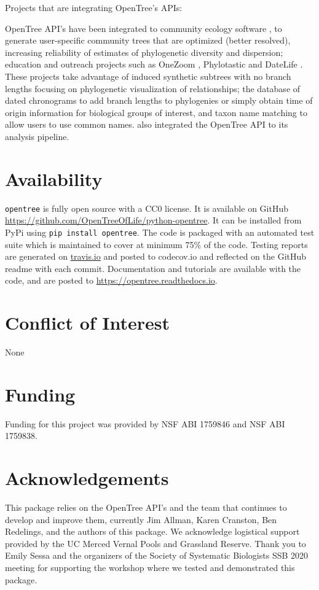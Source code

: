 \documentclass[oupdraft]{sysbio_sse}
\begin{document}
Projects that are integrating OpenTree's APIs:

OpenTree API’s have been integrated to community ecology software \citep{gastauer2018optimizing},
to generate user-specific community trees that are optimized (better resolved),
increasing reliability of estimates of phylogenetic diversity and dispersion;
education and outreach projects such as OneZoom \citep{rosindell2012onezoom, wong2020dynamic},
Phylotastic \citep{stoltzfus2013phylotastic, nguyen2020phylotastic} and DateLife
\citep{sanchez2019datelife}.
These projects take advantage of induced synthetic subtrees with no branch lengths
focusing on phylogenetic visualization of relationships; the database of dated
chronograms to add branch lengths to phylogenies or simply obtain time of origin
information for biological groups of interest, and taxon name matching to allow
users to use common names.
\citep{miller2020codonuse} also integrated the OpenTree API to its analysis pipeline.


\section{Availability}
\label{sec6}

\texttt{opentree} is fully open source with a CC0 license. It is available on GitHub \url{ https://github.com/OpenTreeOfLife/python-opentree}. It can be installed from PyPi using \texttt{pip install opentree}. The code is packaged with an automated test suite which is maintained to cover at minimum 75\% of the code. Testing reports are generated on \url{travis.io} and posted to {codecov.io} and reflected on the GitHub readme with each commit. Documentation and tutorials are available with the code, and are posted to \url{https://opentree.readthedocs.io}.


\section{Conflict of Interest}
None

\section{Funding}
Funding for this project was provided by NSF ABI 1759846 and NSF ABI 1759838.

\section{Acknowledgements}
This package relies on the OpenTree API's and the team that continues to develop and improve them, currently Jim Allman, Karen Cranston, Ben Redelings, and the authors of this package. We acknowledge logistical support provided by the UC Merced Vernal Pools and Grassland Reserve.
Thank you to Emily Sessa and the organizers of the Society of Systematic Biologists SSB 2020 meeting for supporting the workshop where we tested and demonstrated this package.
\end{document}
